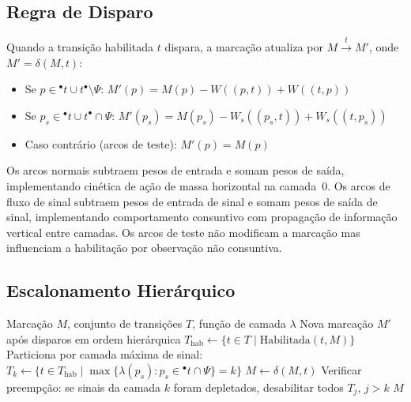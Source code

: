 \subsection{Regra de Disparo}
\label{subsec:disparo}

\begin{definition}
\label{def:disparo}
Quando a transição habilitada $t$ dispara, a marcação atualiza
por $M \xrightarrow{t} M'$, onde $M' = \delta(M, t)$:
\begin{itemize}
  \item Se $p \in {}^\bullet t \cup t^\bullet \setminus \Psi$:
        $M'(p) = M(p) - W((p,t)) + W((t,p))$
  \item Se $p_s \in {}^\bullet t \cup t^\bullet \cap \Psi$:
        $M'(p_s) = M(p_s) - W_s((p_s,t)) + W_s((t,p_s))$
  \item Caso contrário (arcos de teste): $M'(p) = M(p)$
\end{itemize}
\end{definition}

Os arcos normais subtraem pesos de entrada e somam pesos de saída, implementando
cinética de ação de massa horizontal na camada~0. Os arcos de fluxo de sinal
subtraem pesos de entrada de sinal e somam pesos de saída de sinal,
implementando comportamento consuntivo com propagação de informação vertical
entre camadas. Os arcos de teste não modificam a marcação mas influenciam a
habilitação por observação não consuntiva.

\subsection{Escalonamento Hierárquico}
\label{subsec:escalonamento}

\begin{algorithm}[H]
\caption{Escalonamento Hierárquico de Transições}
\label{alg:escalonamento}
\begin{algorithmic}[1]
\Require Marcação $M$, conjunto de transições $T$, função de camada $\lambda$
\Ensure Nova marcação $M'$ após disparos em ordem hierárquica
\State $T_{\text{hab}} \gets \{t \in T \mid \text{Habilitada}(t, M)\}$
\State Particiona por camada máxima de sinal: $T_k \gets \{t \in T_{\text{hab}} \mid \max\{\lambda(p_s) : p_s \in {}^\bullet t \cap \Psi\} = k\}$
            \State $M \gets \delta(M, t)$
        \EndIf
    \EndFor
    \State Verificar preempção: se sinais da camada $k$ foram depletados, desabilitar todos $T_j$, $j > k$
\EndFor
\State \Return $M$
\end{algorithmic}
\end{algorithm}

